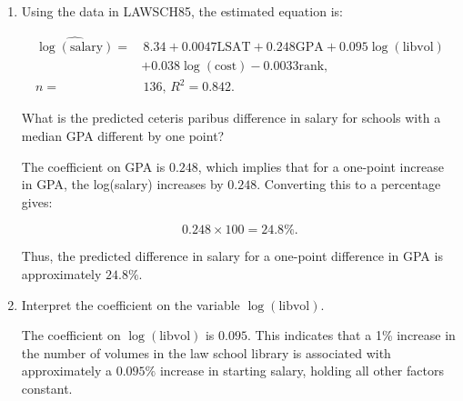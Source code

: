 \documentclass[12pt]{article}
\begin{document}
\begin{enumerate}
{\begin{enumerate}
    \begin{itemize}
        \item \( \beta_1 \) (LSAT): We expect \( \beta_1 > 0 \) because a higher LSAT score is associated with better academic performance and likely higher earning potential.
        \item \( \beta_2 \) (GPA): We expect \( \beta_2 > 0 \) because a higher GPA indicates better academic achievement, which should translate to better job prospects and higher starting salaries.
        \item \( \beta_3 \) (log(libvol)): We expect \( \beta_3 > 0 \) because more volumes in the law school library indicate better resources and facilities, which are likely associated with better law schools.
        \item \( \beta_4 \) (log(cost)): We expect \( \beta_4 > 0 \) because higher tuition costs are often associated with better-ranked schools, which typically have higher starting salaries for graduates.
    \end{itemize}

    \item Using the data in LAWSCH85, the estimated equation is:

    \[
    \begin{aligned}
    \widehat{\log (\text{salary})} = & \, 8.34 + 0.0047 \text{LSAT} + 0.248 \text{GPA} + 0.095 \log (\text{libvol}) \\
    & + 0.038 \log (\text{cost}) - 0.0033 \text{rank}, \\
    n = & \, 136, \, R^2 = 0.842.
    \end{aligned}
    \]

    What is the predicted ceteris paribus difference in salary for schools with a median GPA different by one point?

    The coefficient on GPA is \( 0.248 \), which implies that for a one-point increase in GPA, the log(salary) increases by \( 0.248 \). Converting this to a percentage gives:

    \[
    0.248 \times 100 = 24.8\%.
    \]

    Thus, the predicted difference in salary for a one-point difference in GPA is approximately \( 24.8\% \).

    \item Interpret the coefficient on the variable \( \log(\text{libvol}) \).

    The coefficient on \( \log(\text{libvol}) \) is \( 0.095 \). This indicates that a 1\% increase in the number of volumes in the law school library is associated with approximately a \( 0.095\% \) increase in starting salary, holding all other factors constant.


\end{enumerate}}
\end{enumerate}
\end{document}
